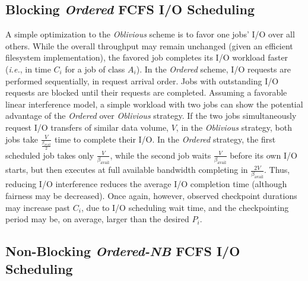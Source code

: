 \documentclass[conference,nofonttune]{IEEEtran}
\newcommand{\ie}[0]{\emph{i.e.}\xspace}
\newcommand{\bandavail}{\beta_{\text{avail}}}
\newcommand{\app}[1]{A_{#1}}
\newcommand{\period}[1]{P_{#1}}
\newcommand{\ckpt}[1]{C_{#1}}
\newcommand{\nocoop}{\emph{Oblivious}\xspace}
\newcommand{\fifoblock}{\emph{Ordered}\xspace}
\newcommand{\fifononblock}{\emph{Ordered-NB}\xspace}
\def\bfifofixed{\fifoblock-Fixed\xspace}
\def\bfifodaly{\fifoblock-Daly\xspace}
\begin{document}
\subsection{Blocking \fifoblock FCFS I/O Scheduling}
\label{sec:fcfsblock}

A simple optimization to the \nocoop scheme is to favor one jobs' I/O over all
others. While the overall throughput may remain unchanged (given an efficient
filesystem implementation), the favored job completes its I/O workload faster
(\ie, in time $\ckpt{i}$ for a job of class $\app{i}$).  In the \fifoblock
scheme, I/O requests are performed sequentially, in request arrival order. Jobs
with outstanding I/O requests are blocked until their requests are completed.
Assuming a favorable linear interference model, a simple workload with two jobs
can show the potential advantage of the \fifoblock over \nocoop strategy.  If
the two jobs simultaneously request I/O transfers of similar data volume, $V$,
in the \nocoop strategy, both jobs take $\frac{V}{\frac{\bandavail}{2}}$ time
to complete their I/O.  In the \fifoblock strategy, the first scheduled job
takes only $\frac{V}{\bandavail}$, while the second job waits
$\frac{V}{\bandavail}$ before its own I/O starts, but then executes at full
available bandwidth completing in $\frac{2V}{\bandavail}$. Thus, reducing I/O
interference reduces the average I/O completion time (although fairness may be
decreased).  Once again, however, observed checkpoint durations may increase
past $\ckpt{i}$, due to I/O scheduling wait time, and the checkpointing period
may be, on average, larger than the desired $\period{i}$.


\subsection{Non-Blocking \fifononblock FCFS I/O Scheduling}
\label{sec:fcfsnonblock}
\end{document}
